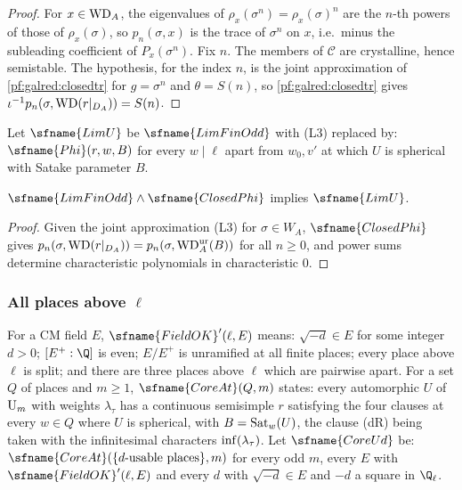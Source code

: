 \begin{proof}
For $x\in\mathrm{WD}_A$, the eigenvalues of $\rho_x(\sigma^n)=\rho_x(\sigma)^n$ are the $n$-th powers of those of
$\rho_x(\sigma)$, so $p_n(\sigma,x)$ is the trace of $\sigma^n$ on $x$, i.e.\ minus the subleading coefficient of
$P_x(\sigma^n)$. Fix $n$. The members of $\mathcal C$ are crystalline, hence semistable. The hypothesis, for the index $n$,
is the joint approximation of \cref{pf:galred:closedtr} for $g=\sigma^n$ and $\theta=S(n)$, so
\cref{pf:galred:closedtr} gives $\iota^{-1}p_n(\sigma,\mathrm{WD}(r|_{D_A}))=S(n)$.
\end{proof}

Let $\sfname{LimU}$ be $\sfname{LimFinOdd}$ with (L3) replaced by: $\sfname{Phi}(r,w,B)$ for every $w\mid\ell$ apart from
$w_0,v'$ at which $U$ is spherical with Satake parameter $B$.

\begin{lemma}\label{pf:galred:limU}
$\sfname{LimFinOdd}\wedge\sfname{ClosedPhi}$ implies $\sfname{LimU}$.
\end{lemma}

\begin{proof}
Given the joint approximation (L3) for $\sigma\in W_A$, $\sfname{ClosedPhi}$ gives $p_n(\sigma,\mathrm{WD}(r|_{D_A}))=
p_n(\sigma,\mathrm{WD}^{\mathrm{ur}}_A(B))$ for all $n\ge0$, and power sums determine characteristic polynomials in characteristic $0$.
\end{proof}

\subsubsection{All places above \texorpdfstring{$\ell$}{l}}

For a CM field $E$, $\sfname{FieldOK}'(\ell,E)$ means: $\sqrt{-d}\in E$ for some integer $d>0$; $[E^+:\Q]$ is even; $E/E^+$ is
unramified at all finite places; every place above $\ell$ is split; and there are three places above $\ell$ which are
pairwise apart. For a set $Q$ of places and $m\ge1$, $\sfname{CoreAt}(Q,m)$ states: every automorphic $U$ of $\mathrm{U}_m$ with
weights $\lambda_\tau$ has a continuous semisimple $r$ satisfying the four clauses at every $w\in Q$ where $U$ is spherical,
with $B=\operatorname{Sat}_w(U)$, the clause (dR) being taken with the infinitesimal characters $\operatorname{inf}(\lambda_\tau)$. Let
$\sfname{CoreUd}$ be: $\sfname{CoreAt}(\{d\text{-usable places}\},m)$ for every odd $m$, every $E$ with
$\sfname{FieldOK}'(\ell,E)$ and every $d$ with $\sqrt{-d}\in E$ and $-d$ a square in $\Q_\ell$.

